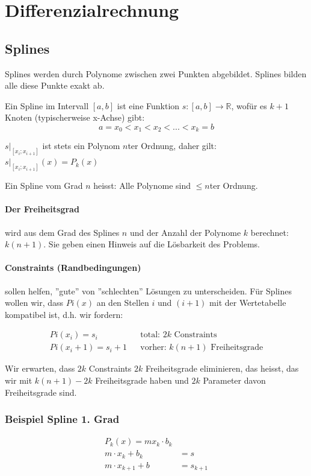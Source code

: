 \section{Differenzialrechnung}

\subsection{Splines}

	Splines werden durch Polynome zwischen zwei Punkten abgebildet.	Splines bilden alle diese Punkte exakt ab.
	
	Ein Spline im Intervall $[a,b]$ ist eine Funktion $s: [a,b] \to \mathbb{R}$, wofür es $k+1$ Knoten (typischerweise x-Achse) gibt:
	\[
	a = x_0 < x_1 < x_2 < ... < x_k = b
	\]
	
	$s|_{[x_i;x_{i+1}]}$ ist stets ein Polynom $n$ter Ordnung, daher gilt: $s|_{[x_i;x_{i+1}]}(x) = P_k(x)$
	
	Ein Spline vom Grad $n$ heisst: Alle Polynome sind $\leq n$ter Ordnung.
	
	\paragraph{Der Freiheitsgrad} wird aus dem Grad des Splines  $n$ und der Anzahl der Polynome $k$ berechnet: $k(n+1)$. Sie geben einen Hinweis auf die Lösbarkeit des Problems.
	
	\paragraph{Constraints (Randbedingungen)} sollen helfen, ''gute'' von ''schlechten'' Lösungen zu unterscheiden. 
	Für Splines wollen wir, dass $Pi(x)$ an den Stellen $i$ und $(i+1)$ mit der Wertetabelle kompatibel ist, d.h. wir fordern:
	
	\begin{align*}
		Pi(x_i) = s_i && \text{total: $2k$ Constraints} \\
		Pi(x_i + 1) = s_i + 1 && \text{vorher: $k(n+1)$ Freiheitsgrade}
	\end{align*}
	
	Wir erwarten, dass $2k$ Constraints $2k$ Freiheitsgrade eliminieren, das heisst, das wir mit $k(n+1) -2k$ Freiheitsgrade haben und $2k$ Parameter davon Freiheitsgrade sind.
	
	\subsubsection{Beispiel Spline 1. Grad}
	
	\begin{align*}
		P_k(x) = mx_k \cdot b_k \\
		m \cdot x_k + b_k &= s \\
		m \cdot x_{k+1} + b &= s_{k + 1}
	\end{align*}
